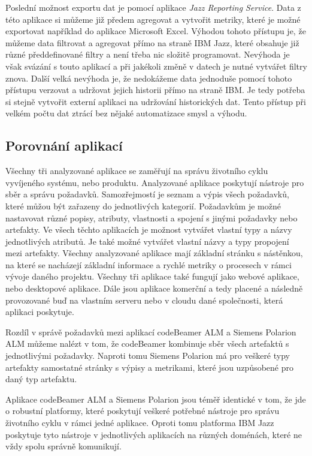 \documentclass[czech,master,public,dept460,male,cpdeclaration,oneside]{diploma}
\begin{document}
Poslední možnost exportu dat je pomocí aplikace \textit{Jazz Reporting Service}. Data z této aplikace si můžeme již předem agregovat a vytvořit metriky, které je možné exportovat například do aplikace Microsoft Excel. Výhodou tohoto přístupu je, že můžeme data filtrovat a agregovat přímo na straně IBM Jazz, které obsahuje již různé předdefinované filtry a není třeba nic složitě programovat. Nevýhoda je však svázání s touto aplikací a při jakékoli změně v datech je nutné vytvářet filtry znova. Další velká nevýhoda je, že nedokážeme data jednoduše pomocí tohoto přístupu verzovat a udržovat jejich historii přímo na straně IBM. Je tedy potřeba si stejně vytvořit externí aplikaci na udržování historických dat. Tento přístup při velkém počtu dat ztrácí bez nějaké automatizace smysl a výhodu. 

\subsection{Porovnání aplikací}
Všechny tři analyzované aplikace se zaměřují na správu životního cyklu vyvíjeného systému, nebo produktu. Analyzované aplikace poskytují nástroje pro sběr a správu požadavků. Samozřejmostí je seznam a výpis všech požadavků, které můžou být zařazeny do jednotlivých kategorií. Požadavkům je možné nastavovat různé popisy, atributy, vlastnosti a spojení s jinými požadavky nebo artefakty. Ve všech těchto aplikacích je možnost vytvářet vlastní typy a názvy jednotlivých atributů. Je také možné vytvářet vlastní názvy a typy propojení mezi artefakty. Všechny analyzované aplikace mají základní stránku s nástěnkou, na které se nacházejí základní informace a rychlé metriky o procesech v rámci vývoje daného projektu. Všechny tři aplikace také fungují jako webové aplikace, nebo desktopové aplikace. Dále jsou aplikace komerční a tedy placené a následně provozované buď na vlastním serveru nebo v cloudu dané společnosti, která aplikaci poskytuje.

Rozdíl v správě požadavků mezi aplikací codeBeamer ALM a Siemens Polarion ALM můžeme nalézt v tom, že codeBeamer kombinuje sběr všech artefaktů s jednotlivými požadavky. Naproti tomu Siemens Polarion má pro veškeré typy artefakty samostatné stránky s výpisy a metrikami, které jsou uzpůsobené pro daný typ artefaktu.

Aplikace codeBeamer ALM a Siemens Polarion jsou téměř identické v tom, že jde o robustní platformy, které poskytují veškeré potřebné nástroje pro správu životního cyklu v rámci jedné aplikace. Oproti tomu platforma IBM Jazz poskytuje tyto nástroje v jednotlivých aplikacích na různých doménách, které ne vždy spolu správně komunikují.
\end{document}
